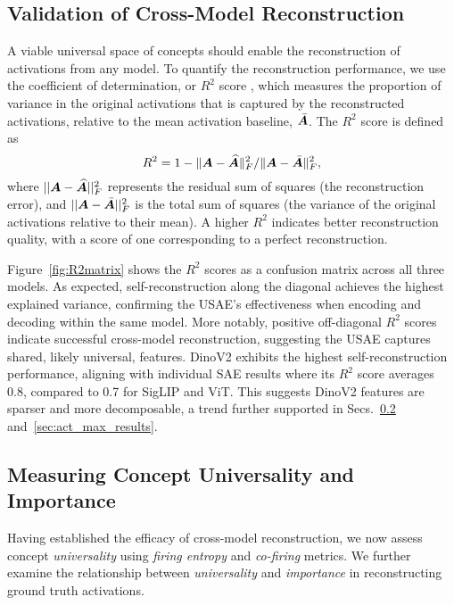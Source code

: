 \vspace{-2mm}
\subsection{Validation of Cross-Model Reconstruction}\label{sec:val_reconstruct}
\vspace{-1mm}
A viable universal space of concepts should enable the reconstruction of activations from any model.
To quantify the reconstruction performance, we use the coefficient of determination, or $R^2$ score \cite{wright1921correlation}, which measures the proportion of variance in the original activations that is captured by the reconstructed activations, relative to the mean activation baseline, $\bar{\bm{A}}$. The $R^2$ score is defined as
\begin{equation}
    R^2 = 1 - \|\bm{A} - \widehat{\bm{A}}\|_F^2/\|\bm{A} - \bar{\bm{A}}\|_F^2,
\end{equation}
where \( ||\bm{A} - \widehat{\bm{A}}||_F^2 \) represents the residual sum of squares (the reconstruction error), and \( ||\bm{A} - \bar{\bm{A}}||_F^2 \) is the total sum of squares (the variance of the original activations relative to their mean).
A higher $R^2$ indicates better reconstruction quality, with a score of one corresponding to a perfect reconstruction.

Figure~\ref{fig:R2matrix} shows the $R^2$ scores as a confusion matrix across all three models. As expected, self-reconstruction along the diagonal achieves the highest explained variance, confirming the USAE’s effectiveness when encoding and decoding within the same model. More notably, positive off-diagonal $R^2$ scores indicate successful cross-model reconstruction, suggesting the USAE captures shared, likely universal, features. DinoV2 exhibits the highest self-reconstruction performance, aligning with individual SAE results where its $R^2$ score averages 0.8, compared to 0.7 for SigLIP and ViT. This suggests DinoV2 features are sparser and more decomposable, a trend further supported in Secs.~\ref{sec:concept_universality} and~\ref{sec:act_max_results}.



\vspace{-2mm}
\subsection{Measuring Concept Universality and Importance}\label{sec:concept_universality}
\vspace{-1mm}
Having established the efficacy of cross-model reconstruction, we now assess concept \textit{universality} using \emph{firing entropy} and \emph{co-firing} metrics. We further examine the relationship between \textit{universality} and \textit{importance} in reconstructing ground truth activations.

